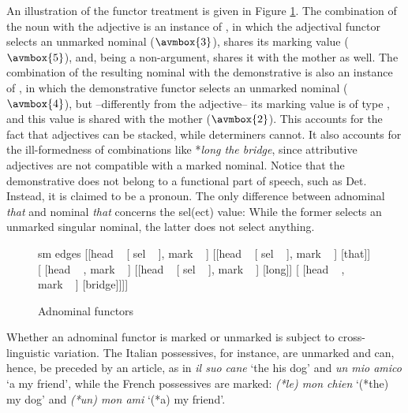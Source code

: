 \documentclass[output=paper]{langsci/langscibook}
\begin{document}
An illustration of the functor treatment is given in Figure \ref{markyy}. 
The combination of the noun with the adjective is an instance of , 
in which the adjectival functor selects an unmarked nominal ($\avmbox{3}$),  
shares its {\sc marking} value ($\avmbox{5}$), and, being a non-argument, 
shares it with the mother as well. 
The combination of the resulting nominal with the demonstrative is also 
an instance of ,
in which the demonstrative functor selects an unmarked nominal ($\avmbox{4}$), 
but --differently from the adjective-- its {\sc marking} value is of type 
, and this value is shared with the mother ($\avmbox{2}$).    
This accounts for the fact that adjectives can be stacked, while  
determiners cannot. It also accounts for the ill-formedness of combinations like 
*\emph{long the bridge}, since attributive adjectives are not compatible with a
marked nominal.  
Notice that the demonstrative does not belong to a functional part of speech, such as Det.
Instead, it is claimed to be a pronoun. The only difference between adnominal \emph{that} and nominal
\emph{that} concerns the {\sc sel(ect)} value: While the former selects an unmarked singular nominal, 
the latter does not select anything.      

\begin{figure}
	\centering
	\begin{forest}
sm edges
[{[{\sc head} ~  [ {\sc sel} ~ ], {\sc mark} ~  ]}
	[{[{\sc head} ~ [ {\sc sel} ~ ], {\sc mark} ~ ]} [that]]
	[{ [{\sc head} ~ , {\sc mark} ~  ]}
		[{[{\sc head} ~ [ {\sc sel} ~ ], {\sc mark} ~ ]} [long]]
		[{ [{\sc head} ~ , {\sc mark} ~ ]} [bridge]]]]
	\end{forest}
	\caption{\label{markyy} Adnominal functors}
\end{figure}

Whether an adnominal functor is marked or unmarked is subject to cross-linguistic variation. 
The Italian possessives, for instance, are unmarked and can, hence, be preceded 
by an article, as in \emph{il suo cane} `the his dog' and \emph{un mio amico} `a my friend', 
while the French possessives are marked: \emph{(*le) mon chien} `(*the) my dog' 
and \emph{(*un) mon ami} `(*a) my friend'. 
\end{document}
